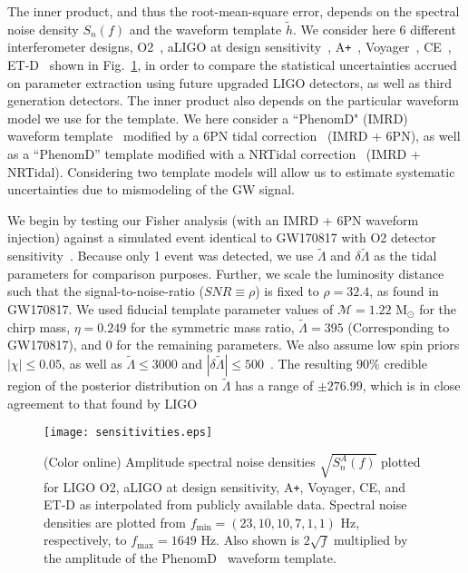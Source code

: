 \documentclass[prd,twocolumn,nofootinbib,superscriptaddress,amsmath,amssymb]{revtex4-1}
\begin{document}
The inner product, and thus the root-mean-square error, depends on the spectral noise density $S_{n}(f)$ and the waveform template $\tilde{h}$. We consider here 6 different interferometer designs, O2~\cite{aLIGO}, aLIGO at design sensitivity~\cite{aLIGO}, A\texttt{+}~\cite{Ap_Voyager_CE}, Voyager~\cite{Ap_Voyager_CE}, CE~\cite{ET}, ET-D~\cite{Ap_Voyager_CE} shown in Fig.~\ref{fig:sensitivities}, in order to compare the statistical uncertainties accrued on parameter extraction using future upgraded LIGO detectors, as well as third generation detectors. The inner product also depends on the particular waveform model we use for the template. We here consider a ``PhenomD" (IMRD) waveform template~\cite{PhenomDI,PhenomDII} modified by a 6PN tidal correction~\cite{Wade:tidalCorrections} (IMRD + 6PN), as well as a ``PhenomD'' template modified with a NRTidal correction~\cite{Samajdar:NRTidal} (IMRD + NRTidal). Considering two template models will allow us to estimate systematic uncertainties due to mismodeling of the GW signal. 

We begin by testing our Fisher analysis (with an IMRD + 6PN waveform injection) against a simulated event identical to GW170817 with O2 detector sensitivity~\cite{aLIGO}. Because only 1 event was detected, we use $\tilde\Lambda$ and $\delta\tilde\Lambda$ as the tidal parameters for comparison purposes. Further, we scale the luminosity distance such that the signal-to-noise-ratio ($SNR \equiv \rho$) is fixed to $\rho=32.4$, as found in GW170817. We used fiducial template parameter values of $\mathcal{M}=1.22\text{ M}_\odot$ for the chirp mass, $\eta=0.249$ for the symmetric mass ratio, $\tilde\Lambda=395$ (Corresponding to GW170817), and $0$ for the remaining parameters. We also assume low spin priors $|\chi| \leq 0.05$, as well as $\tilde{\Lambda} \leq 3000$ and $|\delta \tilde{\Lambda}| \leq 500$~\cite{Wade:LambdaPriors}. The resulting $90\%$ credible region of the posterior distribution on $\tilde{\Lambda}$ has a range of $\pm 276.99$, which is in close agreement to that found by LIGO~\cite{TheLIGOScientific:2017qsa,Abbott2018}

\begin{figure}
\begin{center} 
\texttt{[image: sensitivities.eps]}
\end{center}
\caption{(Color online)
Amplitude spectral noise densities $\sqrt{S_n^A(f)}$ plotted for LIGO O2, aLIGO at design sensitivity, A\texttt{+}, Voyager, CE, and ET-D as interpolated from publicly available data.
Spectral noise densities are plotted from $f_{\text{min}}=(23,10,10,7,1,1) \text{ Hz}$, respectively, to $f_{\text{max}}=1649 \text{ Hz}$.
Also shown is $2 \sqrt{f}$ multiplied by the amplitude of the PhenomD~\cite{PhenomDI,PhenomDII} waveform template.
}
\label{fig:sensitivities}
\end{figure}
\end{document}
